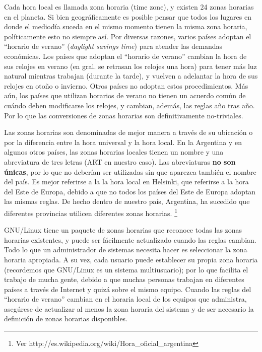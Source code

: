 \documentclass[12pt]{article}
\begin{document}
Cada hora local es llamada zona horaria (time zone), y existen 24 zonas horarias
en el planeta. Si bien geográficamente es posible pensar que todos los lugares
en donde el mediodía suceda en el mismo momento tienen la misma zona horaria,
políticamente esto no siempre así. Por diversas razones, varios países
adoptan el ``horario de verano'' (\textit{daylight savings time}) para atender las demandas
económicas. Los países que adoptan el ``horario de verano'' cambian la hora
de sus relojes en verano (en gral. se retrasan los relojes una hora) para
tener más luz natural mientras trabajan (durante la tarde), y vuelven a adelantar
la hora de sus relojes en otoño o invierno. Otros países no adoptan estos procedimientos.
Más aún, los países que utilizan horarios de verano no tienen un acuerdo común de cuándo deben
modificarse los relojes, y cambian, además, las reglas año tras año. Por lo que las
conversiones de zonas horarias son definitivamente no-triviales.

Las zonas horarias son denominadas de mejor manera a través de su ubicación o por
la diferencia entre la hora universal y la hora local. En la Argentina y
en algunos otros países, las zonas horarias locales tienen un nombre y una abreviatura
de tres letras (ART en nuestro caso). Las abreviaturas \textbf{no son únicas}, por lo que no deberían
ser utilizadas sin que aparezca también el nombre del país. Es mejor referirse a la
la hora local en Helsinki, que referirse a la hora del Este de Europa, debido a que
no todos los países del Este de Europa adoptan las mismas reglas. De hecho dentro 
de nuestro país, Argentina,  ha sucedido que diferentes provincias utilicen diferentes
zonas horarias. \footnote{Ver http://es.wikipedia.org/wiki/Hora\_oficial\_argentina}


GNU/Linux tiene un paquete de zonas horarias que reconoce todas las zonas horarias existentes,
y puede ser fácilmente actualizado cuando las reglas cambian. Todo lo que un administrador de 
sistemas necesita hacer es seleccionar la zona horaria apropiada. A su vez, cada usuario 
puede establecer su propia zona horaria (recordemos que GNU/Linux es un sistema multiusuario); 
por lo que facilita el trabajo de mucha gente, debido a que muchas personas trabajan en diferentes 
países a través de Internet y quizá sobre el mismo equipo.
Cuando las reglas del ``horario de verano'' cambian en el horaria local de los equipos que 
administra, asegúrese de actualizar al menos la zona horaria del sistema y de ser necesario 
la definición de zonas horarias disponibles. 
\end{document}

